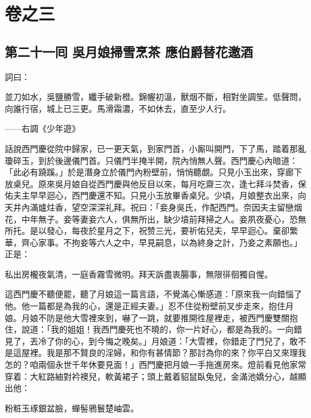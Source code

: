 \part*{{\titlename}卷之三}



\chapter*{第二十一囘 吳月娘掃雪烹茶 應伯爵替花邀酒}


詞曰：

並刀如水，吳鹽勝雪，纖手破新橙。錦幄初溫，獸烟不斷，相對坐調笙。低聲問，向誰行宿，城上已三更。馬滑霜濃，不如休去，直至少人行。

——右調《少年遊》

話說西門慶從院中歸家，已一更天氣，到家門首，小厮叫開門，下了馬，踏着那亂瓊碎玉，到於後邊儀門首。只儀門半掩半開，院內悄無人聲。西門慶心內暗道：「此必有蹺蹊。」{}於是潛身立於儀門內粉壁前，悄悄聽覷。只見小玉出來，穿廊下放桌兒。原來吳月娘自從西門慶與他反目以來，{}每月吃齋三次，逢七拜斗焚香，保佑夫主早早迴心，西門慶還不知。只見小玉放畢香桌兒。少頃，月娘整衣出來，向天井內滿爐炷香，望空深深礼拜。祝曰：「妾身吳氏，作配西門。奈因夫主留戀烟花，中年無子。妾等妻妾六人，俱無所出，缺少墳前拜掃之人。妾夙夜憂心，恐無所托。是以發心，每夜於星月之下，祝赞三光，要祈佑兒夫，早早迴心。棄卻繁華，齊心家事。不拘妾等六人之中，早見嗣息，以為終身之計，乃妾之素願也。」{}正是：

私出房櫳夜氣清，一庭香霧雪微明。拜天訴盡衷腸事，無限徘徊獨自惺。

這西門慶不聽便罷，聽了月娘這一篇言語，不覺滿心慚感道：「原來我一向錯惱了他。他一篇都是為我的心，還是正經夫妻。」忍不住從粉壁前叉步走來，抱住月娘。月娘不防是他大雪裡來到，嚇了一跳，就要推開徃屋裡走，被西門慶雙關抱住，說道：「我的姐姐！我西門慶死也不曉的，你一片好心，都是為我的。一向錯見了，丟冷了你的心，到今悔之晚矣。」月娘道：「大雪裡，你錯走了門兒了，敢不是這屋裡。我是那不賢良的淫婦，和你有甚情節？那討為你的來？你平白又來理我怎的？咱兩個永世千年休要見面！」西門慶把月娘一手拖進房來。燈前看見他家常穿着：大紅路紬對衿襖兒，軟黃裙子；頭上戴着貂鼠臥兔兒，金滿池嬌分心，越顯出他：

粉粧玉琢銀盆臉，蟬髻鴉鬟楚岫雲。{}

